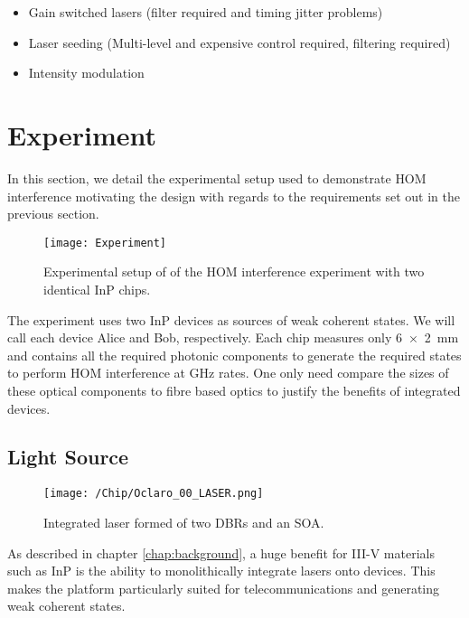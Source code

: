 \begin{itemize}
	\item Gain switched lasers (filter required and timing jitter problems)
	\item Laser seeding	(Multi-level and expensive control required, filtering required)
	\item Intensity modulation
\end{itemize}

\section{Experiment}

In this section, we detail the experimental setup used to demonstrate \ac{HOM} interference motivating the design with regards to the requirements set out in the previous section. 

\begin{figure}[tbp]
	\centering
	\texttt{[image: Experiment]}
	\caption[HOM experimental setup]{Experimental setup of of the \ac{HOM} interference experiment with two identical \ac{InP} chips.}
	\label{fig:hom_experiment}
\end{figure}

The experiment uses two \ac{InP} devices as sources of weak coherent states. We will call each device Alice and Bob, respectively. Each chip measures only \SI[product-units=power]{6x2}{mm} and contains all the required photonic components to generate the required states to perform \ac{HOM} interference at GHz rates. One only need compare the sizes of these optical components to fibre based optics to justify the benefits of integrated devices.

\subsection{Light Source}

\begin{figure}
	\centering
	\texttt{[image: /Chip/Oclaro\_00\_LASER.png]}
	\caption{Integrated laser formed of two DBRs and an SOA.}
	\label{fig:InP_laser}
\end{figure}

As described in chapter \ref{chap:background}, a huge benefit for III-V materials such as \ac{InP} is the ability to monolithically integrate lasers onto devices. This makes the platform particularly suited for telecommunications and generating weak coherent states. 

